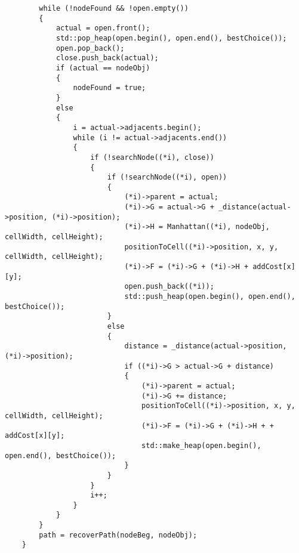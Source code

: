 \begin{lstlisting}
        while (!nodeFound && !open.empty())
        {
            actual = open.front();
            std::pop_heap(open.begin(), open.end(), bestChoice());
            open.pop_back();
            close.push_back(actual);
            if (actual == nodeObj)
            {
                nodeFound = true;
            }
            else
            {
                i = actual->adjacents.begin();
                while (i != actual->adjacents.end())
                {
                    if (!searchNode((*i), close))
                    {
                        if (!searchNode((*i), open))
                        {
                            (*i)->parent = actual;
                            (*i)->G = actual->G + _distance(actual->position, (*i)->position);
                            (*i)->H = Manhattan((*i), nodeObj, cellWidth, cellHeight);
                            positionToCell((*i)->position, x, y, cellWidth, cellHeight);
                            (*i)->F = (*i)->G + (*i)->H + addCost[x][y];
                            open.push_back((*i));
                            std::push_heap(open.begin(), open.end(), bestChoice());
                        }
                        else
                        {
                            distance = _distance(actual->position, (*i)->position);
                            if ((*i)->G > actual->G + distance)
                            {
                                (*i)->parent = actual;
                                (*i)->G += distance;
                                positionToCell((*i)->position, x, y, cellWidth, cellHeight);
                                (*i)->F = (*i)->G + (*i)->H + + addCost[x][y];
                                std::make_heap(open.begin(), open.end(), bestChoice());
                            }
                        }
                    }
                    i++;
                }
            }
        }
        path = recoverPath(nodeBeg, nodeObj);
    }
    
\end{lstlisting}
